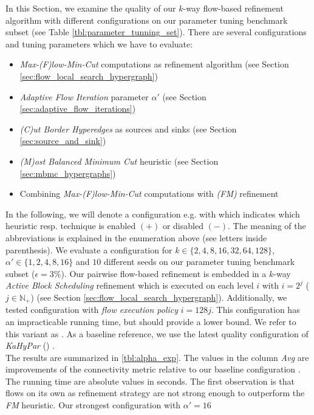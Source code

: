 In this Section, we examine the quality of our $k$-way flow-based refinement algorithm with
different configurations on our parameter tuning benchmark subset (see Table \ref{tbl:parameter_tunning_set}).
There are several configurations and tuning parameters which we have to evaluate:
\begin{itemize}
\item \emph{Max-(F)low-Min-Cut} computations as refinement algorithm (see Section \ref{sec:flow_local_search_hypergraph})
\item \emph{Adaptive Flow Iteration} parameter $\alpha'$ (see Section \ref{sec:adaptive_flow_iterations})
\item \emph{(C)ut Border Hyperedges} as sources and sinks (see Section \ref{sec:source_and_sink})
\item \emph{(M)ost Balanced Minimum Cut} heuristic (see Section \ref{sec:mbmc_hypergraphs})
\item Combining \emph{Max-(F)low-Min-Cut} computations with \emph{(FM)} refinement
\end{itemize}
In the following, we will denote a configuration e.g. with \FlowVariant{+}{-}{-}{-} which indicates
which heuristic resp. technique is enabled $(+)$ or disabled $(-)$. The meaning of the 
abbreviations is explained in the enumeration above (see letters inside parenthesis). We evaluate
a configuration for $k \in \{2,4,8,16,32,64,128\}$, $\alpha' \in \{1,2,4,8,16\}$
and $10$ different seeds on our parameter tuning benchmark subset ($\epsilon = 3\%$). 
Our pairwise flow-based refinement is embedded in a $k$-way \emph{Active Block Scheduling}
refinement which is executed on each level $i$ with $i = 2^j$ ($j \in \mathbb{N}_+$) 
(see Section \ref{sec:flow_local_search_hypergraph}). Additionally, we tested configuration
\FlowVariant{+}{+}{+}{+} with \emph{flow execution policy} $i = 128j$. This configuration
has an impracticable running time, but should provide a lower bound.
We refer to this variant as . As a baseline reference, we use the 
latest quality configuration of \emph{KaHyPar} () \cite{heuer2017improving}. \\
The results are summarized in \autoref{tbl:alpha_exp}. The values
in the column \emph{Avg} are improvements of the connectivity metric
relative to our baseline configuration \FlowVariant{-}{-}{-}{+}. The running
time are absolute values in seconds. The first observation is that flows on
its own as refinement strategy are not strong enough to outperform the
\emph{FM} heuristic. Our strongest configuration with $\alpha' = 16$
